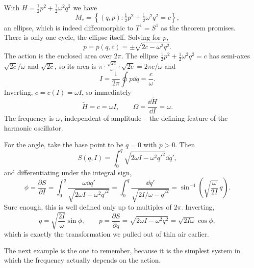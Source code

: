 \begin{example}
	With $H = \frac{1}{2}p^2 + \frac{1}{2}\omega^2q^2$ we have
	$$
	M_c = \left\{(q,p) : \tfrac{1}{2}p^2 + \tfrac{1}{2}\omega^2q^2 = c\right\},
	$$
	an ellipse, which is indeed diffeomorphic to $T^1 = S^1$ as the theorem promises. There is only one cycle, the ellipse itself. Solving for $p$,
	$$
	p = p(q,c) = \pm\sqrt{2c - \omega^2q^2}.
	$$
	The action is the enclosed area over $2\pi$. The ellipse $\frac{1}{2}p^2 + \frac{1}{2}\omega^2 q^2 = c$ has semi-axes $\sqrt{2c}/\omega$ and $\sqrt{2c}$, so its area is $\pi\cdot\frac{\sqrt{2c}}{\omega}\cdot\sqrt{2c} = 2\pi c/\omega$ and
	$$
	I = \frac{1}{2\pi}\oint p\dd q = \frac{c}{\omega}.
	$$
	Inverting, $c = c(I) = \omega I$, so immediately
	$$
	\tilde H = c = \omega I, \qquad \Omega = \frac{\dd\tilde H}{\dd I} = \omega.
	$$
	The frequency is $\omega$, independent of amplitude -- the defining feature of the harmonic oscillator.

	For the angle, take the base point to be $q = 0$ with $p > 0$. Then
	$$
	S(q, I) = \int_0^q\sqrt{2\omega I - \omega^2 q'^2}\dd q',
	$$
	and differentiating under the integral sign,
	$$
	\phi = \frac{\partial S}{\partial I} = \int_0^q\frac{\omega \dd q'}{\sqrt{2\omega I - \omega^2 q'^2}} = \int_0^q \frac{\dd q'}{\sqrt{2I/\omega - q'^2}} = \sin^{-1}\left(\sqrt{\frac{\omega}{2I}}\,q\right).
	$$
	Sure enough, this is well defined only up to multiples of $2\pi$. Inverting,
	$$
	q = \sqrt{\frac{2I}{\omega}}\sin\phi, \qquad p = \frac{\partial S}{\partial q} = \sqrt{2\omega I - \omega^2q^2} = \sqrt{2I\omega}\cos\phi,
	$$
	which is exactly the transformation we pulled out of thin air earlier.
\end{example}

The next example is the one to remember, because it is the simplest system in which the frequency actually depends on the action.

